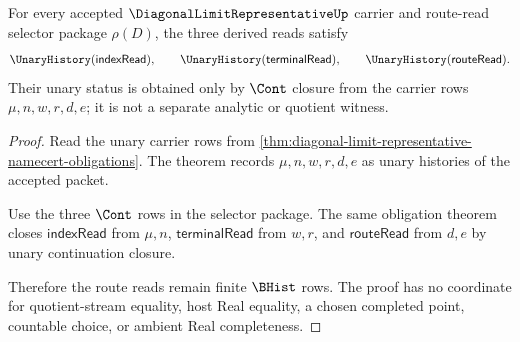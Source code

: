 \begin{theorem}
\label{thm:diagonal-limit-representative-route-read-unary-closure}
For every accepted $\DiagonalLimitRepresentativeUp$ carrier and route-read selector package $\rho(D)$, the three derived reads satisfy
$$
\UnaryHistory(\mathsf{indexRead}),\qquad
\UnaryHistory(\mathsf{terminalRead}),\qquad
\UnaryHistory(\mathsf{routeRead}).
$$
Their unary status is obtained only by $\Cont$ closure from the carrier rows $\mu,n,w,r,d,e$; it is not a separate analytic or quotient witness.
\end{theorem}
\begin{proof}
Read the unary carrier rows from \autoref{thm:diagonal-limit-representative-namecert-obligations}. The theorem records $\mu,n,w,r,d,e$ as unary histories of the accepted packet.

Use the three $\Cont$ rows in the selector package. The same obligation theorem closes $\mathsf{indexRead}$ from $\mu,n$, $\mathsf{terminalRead}$ from $w,r$, and $\mathsf{routeRead}$ from $d,e$ by unary continuation closure.

Therefore the route reads remain finite $\BHist$ rows. The proof has no coordinate for quotient-stream equality, host Real equality, a chosen completed point, countable choice, or ambient Real completeness.
\end{proof}

